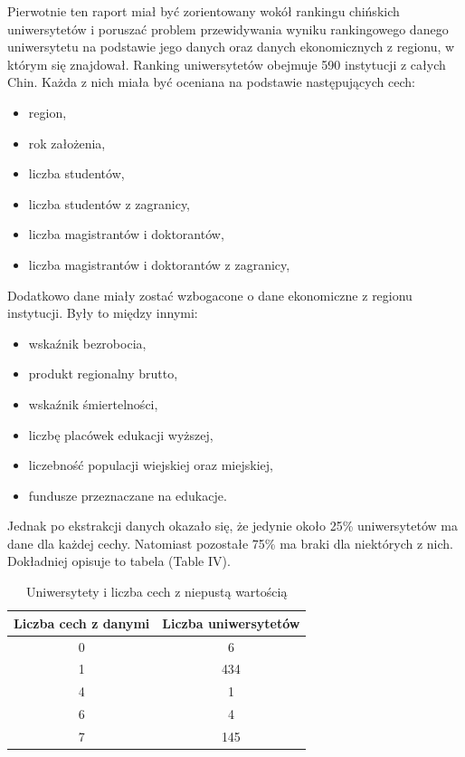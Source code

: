 \documentclass[conference]{IEEEtran}
\begin{document}
\clearpage
\appendix
Pierwotnie ten raport miał być zorientowany wokół rankingu chińskich uniwersytetów \cite{bcur} i poruszać problem przewidywania wyniku rankingowego danego uniwersytetu na podstawie jego danych oraz danych ekonomicznych z regionu, w którym się znajdował.
Ranking uniwersytetów obejmuje 590 instytucji z całych Chin. Każda z nich miała być oceniana na podstawie następujących cech:
\begin{itemize}

    \item region,
    \item rok założenia,
    \item liczba studentów,
    \item liczba studentów z zagranicy,
    \item liczba magistrantów i doktorantów,
    \item liczba magistrantów i doktorantów z zagranicy,
\end{itemize}
Dodatkowo dane miały zostać wzbogacone o dane ekonomiczne z regionu instytucji. Były to między innymi:
\begin{itemize}
    \item wskaźnik bezrobocia,
    \item produkt regionalny brutto,
    \item wskaźnik śmiertelności,
    \item liczbę placówek edukacji wyższej,
    \item liczebność populacji wiejskiej oraz miejskiej,
    \item fundusze przeznaczane na edukacje.
\end{itemize}
Jednak po ekstrakcji danych okazało się, że jedynie około 25\% uniwersytetów ma dane dla każdej cechy. Natomiast pozostałe 75\% ma braki dla niektórych z nich. Dokładniej opisuje to tabela (Table IV). 
\begin{table}[ht]
    \centering
    \begin{tabular}{|c|c|}
        \hline
        Liczba cech z danymi & Liczba uniwersytetów\\
        \hline
        0 &  6 \\
        \hline
        1 &  434 \\
        \hline
        4 &  1 \\
        \hline
        6 & 4 \\
        \hline
        7 & 145 \\
        \hline
    \end{tabular}
    \caption{Uniwersytety i liczba cech z niepustą wartością}

\end{table}
\end{document}
